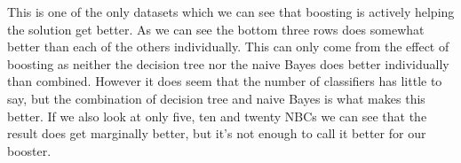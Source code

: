 This is one of the only datasets which we can see that boosting is actively
helping the solution get better. As we can see the bottom three rows does
somewhat better than each of the others individually. This can only come from
the effect of boosting as neither the decision tree nor the naive Bayes does
better individually than combined. However it does seem that the number of
classifiers has little to say, but the combination of decision tree and naive
Bayes is what makes this better. If we also look at only five, ten and twenty
NBCs we can see that the result does get marginally better, but it's not enough
to call it better for our booster.
